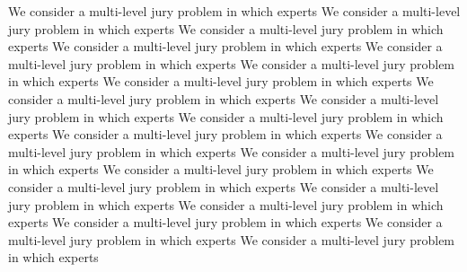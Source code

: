 \documentclass[letterpaper]{article} %
\begin{document}

We consider a multi-level jury problem in which experts
We consider a multi-level jury problem in which experts
We consider a multi-level jury problem in which experts
We consider a multi-level jury problem in which experts
We consider a multi-level jury problem in which experts
We consider a multi-level jury problem in which experts
We consider a multi-level jury problem in which experts
We consider a multi-level jury problem in which experts
We consider a multi-level jury problem in which experts
We consider a multi-level jury problem in which experts
We consider a multi-level jury problem in which experts
We consider a multi-level jury problem in which experts
We consider a multi-level jury problem in which experts
We consider a multi-level jury problem in which experts
We consider a multi-level jury problem in which experts
We consider a multi-level jury problem in which experts
We consider a multi-level jury problem in which experts
We consider a multi-level jury problem in which experts
We consider a multi-level jury problem in which experts
We consider a multi-level jury problem in which experts
\clearpage

\end{document}
